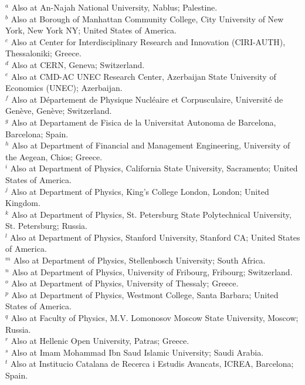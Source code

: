 \begin{flushleft}
$^{a}$ Also at An-Najah National University, Nablus; Palestine.\\
$^{b}$ Also at Borough of Manhattan Community College, City University of New York, New York NY; United States of America.\\
$^{c}$ Also at Center for Interdisciplinary Research and Innovation (CIRI-AUTH), Thessaloniki; Greece.\\
$^{d}$ Also at CERN, Geneva; Switzerland.\\
$^{e}$ Also at CMD-AC UNEC Research Center, Azerbaijan State University of Economics (UNEC); Azerbaijan.\\
$^{f}$ Also at D\'epartement de Physique Nucl\'eaire et Corpusculaire, Universit\'e de Gen\`eve, Gen\`eve; Switzerland.\\
$^{g}$ Also at Departament de Fisica de la Universitat Autonoma de Barcelona, Barcelona; Spain.\\
$^{h}$ Also at Department of Financial and Management Engineering, University of the Aegean, Chios; Greece.\\
$^{i}$ Also at Department of Physics, California State University, Sacramento; United States of America.\\
$^{j}$ Also at Department of Physics, King's College London, London; United Kingdom.\\
$^{k}$ Also at Department of Physics, St. Petersburg State Polytechnical University, St. Petersburg; Russia.\\
$^{l}$ Also at Department of Physics, Stanford University, Stanford CA; United States of America.\\
$^{m}$ Also at Department of Physics, Stellenbosch University; South Africa.\\
$^{n}$ Also at Department of Physics, University of Fribourg, Fribourg; Switzerland.\\
$^{o}$ Also at Department of Physics, University of Thessaly; Greece.\\
$^{p}$ Also at Department of Physics, Westmont College, Santa Barbara; United States of America.\\
$^{q}$ Also at Faculty of Physics, M.V. Lomonosov Moscow State University, Moscow; Russia.\\
$^{r}$ Also at Hellenic Open University, Patras; Greece.\\
$^{s}$ Also at Imam Mohammad Ibn Saud Islamic University; Saudi Arabia.\\
$^{t}$ Also at Institucio Catalana de Recerca i Estudis Avancats, ICREA, Barcelona; Spain.\\

\end{flushleft}
